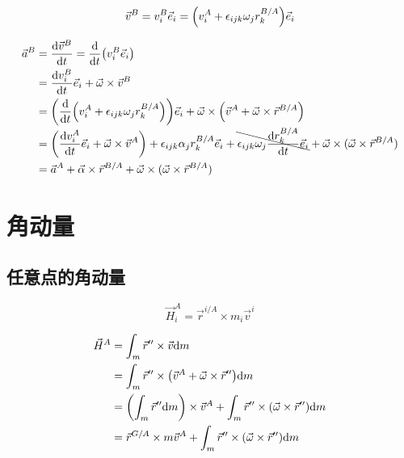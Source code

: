 \begin{equation}
  \vec{v}^B=v^B_i\vec{e}_i=\qty(v^A_i+\epsilon_{ijk}\omega_jr^{B/A}_k)\vec{e}_i
\end{equation}

\begin{equation}
  \begin{split}
    \vec{a}^B&=\frac{\mathrm{d}\vec{v}^B}{\mathrm{d}t}=\frac{\mathrm{d}}{\mathrm{d}t}\qty(v^B_i\vec{e}_i)\\
    &=\frac{\mathrm{d}v^B_i}{\mathrm{d}t}\vec{e}_i+\vec{\omega}\times\vec{v}^B\\
    &=\qty(\frac{\mathrm{d}}{\mathrm{d}t}\qty(v^A_i+\epsilon_{ijk}\omega_jr^{B/A}_k))\vec{e}_i+\vec{\omega}\times\qty(\vec{v}^A+\vec{\omega}\times\vec{r}^{B/A})\\
    &=\qty(\frac{\mathrm{d}v^A_i}{\mathrm{d}t}\vec{e}_i+\vec{\omega}\times\vec{v}^A)+\epsilon_{ijk}\alpha_jr^{B/A}_k\vec{e}_i+\bcancel{\epsilon_{ijk}\omega_j\frac{\mathrm{d}r^{B/A}_k}{\mathrm{d}t}\vec{e}_i}+\vec{\omega}\times(\vec{\omega}\times\vec{r}^{B/A})\\
    &=\vec{a}^A+\vec{\alpha}\times\vec{r}^{B/A}+\vec{\omega}\times(\vec{\omega}\times\vec{r}^{B/A})
  \end{split}
\end{equation}

\section{角动量}
\subsection{任意点的角动量}
\begin{equation}
  \vec{H}^A_i=\vec{r}^{i/A}\times m_i\vec{v}^i
\end{equation}

\begin{equation}
  \begin{split}
    \vec{H}^A&=\int_m\vec{r}''\times\vec{v}\mathrm{d}m\\
    &=\int_m\vec{r}''\times\qty(\vec{v}^A+\vec{\omega}\times\vec{r}'')\mathrm{d}m\\
    &=\qty(\int_m\vec{r}''\mathrm{d}m)\times\vec{v}^A+\int_m\vec{r}''\times(\vec{\omega}\times\vec{r}'')\mathrm{d}m\\
    &=\vec{r}^{G/A}\times m\vec{v}^A+\int_m\vec{r}''\times(\vec{\omega}\times\vec{r}'')\mathrm{d}m
  \end{split}
\end{equation}

